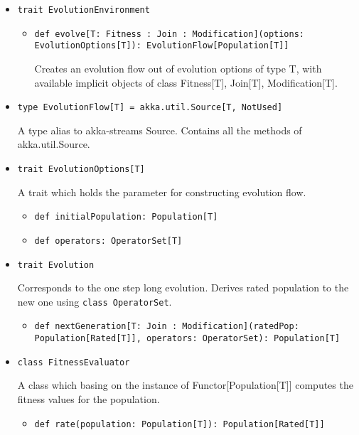 \begin{itemize}

\item \texttt{trait EvolutionEnvironment}

	\begin{itemize}
		\item \texttt{def evolve[T: Fitness : Join : Modification](options: EvolutionOptions[T]): EvolutionFlow[Population[T]]}

		Creates an evolution flow out of evolution options of type T, with available implicit objects of class Fitness[T], Join[T], Modification[T].
	\end{itemize}

\smallskip
\item \texttt{type EvolutionFlow[T] = akka.util.Source[T, NotUsed]}

A type alias to akka-streams Source. Contains all the methods of akka.util.Source.

\smallskip
\item \texttt{trait EvolutionOptions[T]}

A trait which holds the parameter for constructing evolution flow.
\begin{itemize}
	\item \texttt{def initialPopulation: Population[T]}
	\item \texttt{def operators: OperatorSet[T]}
\end{itemize}

\smallskip
\item \texttt{trait Evolution}

Corresponds to the one step long evolution. Derives rated population to the new one using \texttt{class OperatorSet}.
\begin{itemize}
	\item \texttt{def nextGeneration[T: Join : Modification](ratedPop: Population[Rated[T]], operators: OperatorSet): Population[T]}
\end{itemize}

\smallskip
\item \texttt{class FitnessEvaluator}

A class which basing on the instance of Functor[Population[T]] computes the fitness values for the population.
\begin{itemize}
	\item \texttt{def rate(population: Population[T]): Population[Rated[T]]}
\end{itemize}


\end{itemize}

